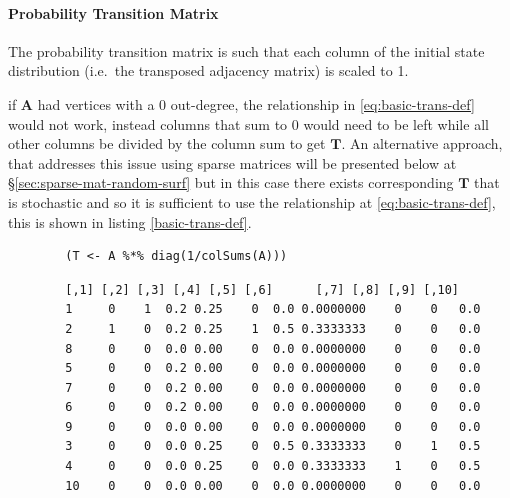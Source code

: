 \documentclass[11pt]{report}
\begin{document}
\paragraph{Probability Transition Matrix}
\label{probability-transition-matrix}
The probability transition matrix is such that each column of the
initial state distribution (i.e. the transposed adjacency matrix) is
scaled to 1.

if \(\mathbf{A}\) had vertices with a 0 out-degree, the relationship in
\eqref{eq:basic-trans-def} would not work, instead columns that sum to 0 would
need to be left while all other columns be divided by the column sum to get
\(\mathbf{T}\). An alternative approach, that addresses this issue using sparse
matrices will be presented below at \S \ref{sec:sparse-mat-random-surf} but in
this case there exists corresponding \(\mathbf{T}\) that is stochastic and so it
is sufficient to use the relationship at \eqref{eq:basic-trans-def}, this is
shown in listing \ref{basic-trans-def}.

\begin{listing}[htbp]
    \begin{tcolorbox}
        \begin{verbatim}
        (T <- A %*% diag(1/colSums(A)))
        \end{verbatim}
        \caption{\label{basic-trans-def}Solve the Transition Probability Matrix by scaling each column to 1 using matrix multiplication.}
    \tcblower
        \begin{verbatim}
        [,1] [,2] [,3] [,4] [,5] [,6]      [,7] [,8] [,9] [,10]
        1     0    1  0.2 0.25    0  0.0 0.0000000    0    0   0.0
        2     1    0  0.2 0.25    1  0.5 0.3333333    0    0   0.0
        8     0    0  0.0 0.00    0  0.0 0.0000000    0    0   0.0
        5     0    0  0.2 0.00    0  0.0 0.0000000    0    0   0.0
        7     0    0  0.2 0.00    0  0.0 0.0000000    0    0   0.0
        6     0    0  0.2 0.00    0  0.0 0.0000000    0    0   0.0
        9     0    0  0.0 0.00    0  0.0 0.0000000    0    0   0.0
        3     0    0  0.0 0.25    0  0.5 0.3333333    0    1   0.5
        4     0    0  0.0 0.25    0  0.0 0.3333333    1    0   0.5
        10    0    0  0.0 0.00    0  0.0 0.0000000    0    0   0.0
        \end{verbatim}
    \end{tcolorbox}
\end{listing}
\end{document}
